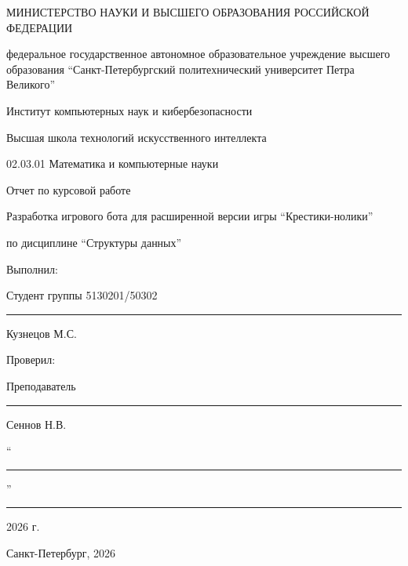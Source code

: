 \documentclass[a4paper,14pt]{extarticle}
\begin{document}
\begin{titlepage}
\fontsize{12}{14}\selectfont
\thispagestyle{empty}
\begin{center}
МИНИСТЕРСТВО НАУКИ И ВЫСШЕГО ОБРАЗОВАНИЯ РОССИЙСКОЙ ФЕДЕРАЦИИ

\vspace{4pt}
{\normalsize федеральное государственное автономное образовательное учреждение высшего образования “Санкт-Петербургский политехнический университет Петра Великого”

\vspace{4pt}
Институт компьютерных наук и кибербезопасности

\vspace{4pt}
Высшая школа технологий искусственного интеллекта

\vspace{4pt}
02.03.01 Математика и компьютерные науки}

\vspace{1.9cm}
{\large Отчет по курсовой работе

\vspace{4pt}
{\normalsize Разработка игрового бота для расширенной версии игры “Крестики-нолики”}

\vspace{4pt}
{\normalsize по дисциплине “Структуры данных”}}
\end{center}

\vspace{2.2cm}
\begin{flushleft}
Выполнил:

Студент группы 5130201/50302\hspace{3.0cm}\rule{3.5cm}{0.5pt}\hspace{3pt}Кузнецов М.С.

\vspace{10pt}
Проверил:

Преподаватель\hspace{6.0cm}\rule{3.5cm}{0.5pt}\hspace{8pt}Сеннов Н.В.
\end{flushleft}

\vspace{0.7cm}
\begin{flushright}
“\rule{1cm}{0.5pt}”\rule{2.1cm}{0.5pt}\hspace{3pt}2026 г.
\end{flushright}

\vfill
\begin{center}
Санкт-Петербург, 2026
\end{center}
\end{titlepage}
\end{document}

